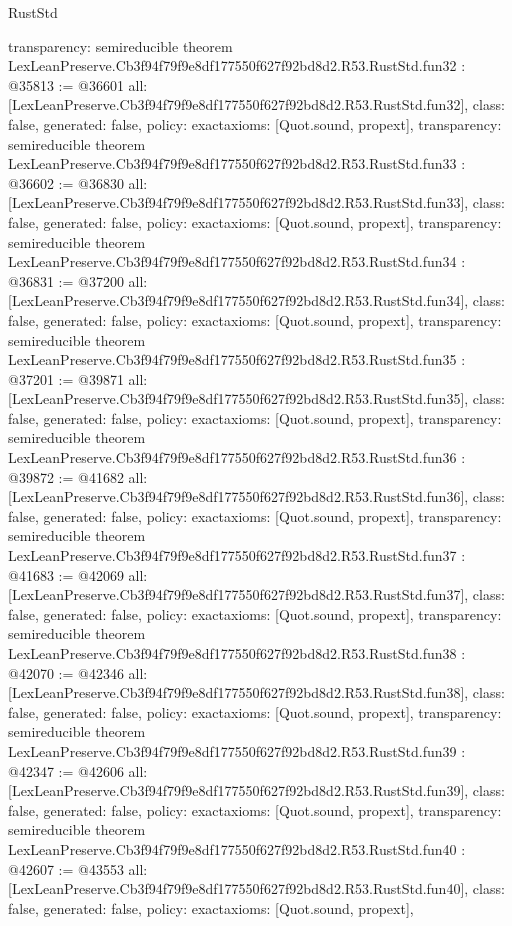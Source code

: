 \begin{lexlean}{RustStd}
\begin{coremodule}
{  transparency: semireducible
}
theorem LexLeanPreserve.Cb3f94f79f9e8df177550f627f92bd8d2.R53.RustStd.fun32 : @35813 := @36601 {
  all: [LexLeanPreserve.Cb3f94f79f9e8df177550f627f92bd8d2.R53.RustStd.fun32],
  class: false,
  generated: false,
  policy: exact{axioms: [Quot.sound, propext]},
  transparency: semireducible
}
theorem LexLeanPreserve.Cb3f94f79f9e8df177550f627f92bd8d2.R53.RustStd.fun33 : @36602 := @36830 {
  all: [LexLeanPreserve.Cb3f94f79f9e8df177550f627f92bd8d2.R53.RustStd.fun33],
  class: false,
  generated: false,
  policy: exact{axioms: [Quot.sound, propext]},
  transparency: semireducible
}
theorem LexLeanPreserve.Cb3f94f79f9e8df177550f627f92bd8d2.R53.RustStd.fun34 : @36831 := @37200 {
  all: [LexLeanPreserve.Cb3f94f79f9e8df177550f627f92bd8d2.R53.RustStd.fun34],
  class: false,
  generated: false,
  policy: exact{axioms: [Quot.sound, propext]},
  transparency: semireducible
}
theorem LexLeanPreserve.Cb3f94f79f9e8df177550f627f92bd8d2.R53.RustStd.fun35 : @37201 := @39871 {
  all: [LexLeanPreserve.Cb3f94f79f9e8df177550f627f92bd8d2.R53.RustStd.fun35],
  class: false,
  generated: false,
  policy: exact{axioms: [Quot.sound, propext]},
  transparency: semireducible
}
theorem LexLeanPreserve.Cb3f94f79f9e8df177550f627f92bd8d2.R53.RustStd.fun36 : @39872 := @41682 {
  all: [LexLeanPreserve.Cb3f94f79f9e8df177550f627f92bd8d2.R53.RustStd.fun36],
  class: false,
  generated: false,
  policy: exact{axioms: [Quot.sound, propext]},
  transparency: semireducible
}
theorem LexLeanPreserve.Cb3f94f79f9e8df177550f627f92bd8d2.R53.RustStd.fun37 : @41683 := @42069 {
  all: [LexLeanPreserve.Cb3f94f79f9e8df177550f627f92bd8d2.R53.RustStd.fun37],
  class: false,
  generated: false,
  policy: exact{axioms: [Quot.sound, propext]},
  transparency: semireducible
}
theorem LexLeanPreserve.Cb3f94f79f9e8df177550f627f92bd8d2.R53.RustStd.fun38 : @42070 := @42346 {
  all: [LexLeanPreserve.Cb3f94f79f9e8df177550f627f92bd8d2.R53.RustStd.fun38],
  class: false,
  generated: false,
  policy: exact{axioms: [Quot.sound, propext]},
  transparency: semireducible
}
theorem LexLeanPreserve.Cb3f94f79f9e8df177550f627f92bd8d2.R53.RustStd.fun39 : @42347 := @42606 {
  all: [LexLeanPreserve.Cb3f94f79f9e8df177550f627f92bd8d2.R53.RustStd.fun39],
  class: false,
  generated: false,
  policy: exact{axioms: [Quot.sound, propext]},
  transparency: semireducible
}
theorem LexLeanPreserve.Cb3f94f79f9e8df177550f627f92bd8d2.R53.RustStd.fun40 : @42607 := @43553 {
  all: [LexLeanPreserve.Cb3f94f79f9e8df177550f627f92bd8d2.R53.RustStd.fun40],
  class: false,
  generated: false,
  policy: exact{axioms: [Quot.sound, propext]},
}
\end{coremodule}
\end{lexlean}
